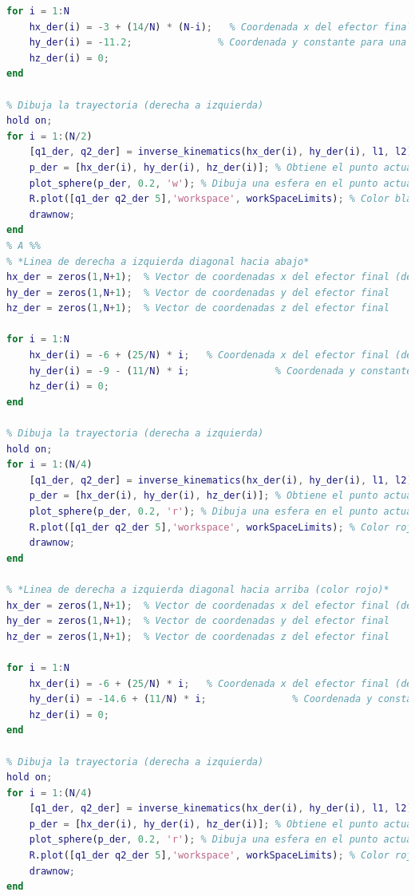 \documentclass[final]{foresj}
\begin{document}
\begin{lstlisting}[language=Matlab]
for i = 1:N
    hx_der(i) = -3 + (14/N) * (N-i);   % Coordenada x del efector final (derecha a izquierda)
    hy_der(i) = -11.2;               % Coordenada y constante para una linea recta
    hz_der(i) = 0;
end

% Dibuja la trayectoria (derecha a izquierda)
hold on;
for i = 1:(N/2)
    [q1_der, q2_der] = inverse_kinematics(hx_der(i), hy_der(i), l1, l2); 
    p_der = [hx_der(i), hy_der(i), hz_der(i)]; % Obtiene el punto actual de la trayectoria
    plot_sphere(p_der, 0.2, 'w'); % Dibuja una esfera en el punto actual para visualizar la trayectoria (color blanco)
    R.plot([q1_der q2_der 5],'workspace', workSpaceLimits); % Color blanco
    drawnow;
end
% A %%
% *Linea de derecha a izquierda diagonal hacia abajo*
hx_der = zeros(1,N+1);  % Vector de coordenadas x del efector final (derecha a izquierda)
hy_der = zeros(1,N+1);  % Vector de coordenadas y del efector final
hz_der = zeros(1,N+1);  % Vector de coordenadas z del efector final

for i = 1:N
    hx_der(i) = -6 + (25/N) * i;   % Coordenada x del efector final (derecha a izquierda)
    hy_der(i) = -9 - (11/N) * i;               % Coordenada y constante para una linea recta (-8)
    hz_der(i) = 0;
end

% Dibuja la trayectoria (derecha a izquierda)
hold on;
for i = 1:(N/4)
    [q1_der, q2_der] = inverse_kinematics(hx_der(i), hy_der(i), l1, l2); 
    p_der = [hx_der(i), hy_der(i), hz_der(i)]; % Obtiene el punto actual de la trayectoria
    plot_sphere(p_der, 0.2, 'r'); % Dibuja una esfera en el punto actual para visualizar la trayectoria (color rojo)
    R.plot([q1_der q2_der 5],'workspace', workSpaceLimits); % Color rojo
    drawnow;
end

% *Linea de derecha a izquierda diagonal hacia arriba (color rojo)*
hx_der = zeros(1,N+1);  % Vector de coordenadas x del efector final (derecha a izquierda)
hy_der = zeros(1,N+1);  % Vector de coordenadas y del efector final
hz_der = zeros(1,N+1);  % Vector de coordenadas z del efector final

for i = 1:N
    hx_der(i) = -6 + (25/N) * i;   % Coordenada x del efector final (derecha a izquierda)
    hy_der(i) = -14.6 + (11/N) * i;               % Coordenada y constante para una linea recta (-8)
    hz_der(i) = 0;
end

% Dibuja la trayectoria (derecha a izquierda) 
hold on;
for i = 1:(N/4)
    [q1_der, q2_der] = inverse_kinematics(hx_der(i), hy_der(i), l1, l2); 
    p_der = [hx_der(i), hy_der(i), hz_der(i)]; % Obtiene el punto actual de la trayectoria
    plot_sphere(p_der, 0.2, 'r'); % Dibuja una esfera en el punto actual para visualizar la trayectoria (color rojo)
    R.plot([q1_der q2_der 5],'workspace', workSpaceLimits); % Color rojo
    drawnow;
end


\end{lstlisting}
\end{document}
